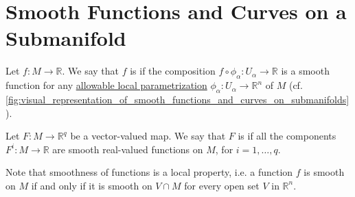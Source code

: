 \documentclass[notoc,notitlepage]{tufte-book}
\begin{document}

\section{Smooth Functions and Curves on a Submanifold}%
\label{sec:smooth_functions_and_curves_on_a_submanifold}

\begin{defn}\label{defn:smooth_functions_on_submanifolds}
  Let $f : M \to \mathbb{R}$. We say that $f$ is  if the
  composition $f \circ \phi_\alpha : U_\alpha \to \mathbb{R}$ is a smooth
  function for any \hyperref[defn:local_parametrizations]{allowable local
  parametrization} $\phi_\alpha : U_\alpha \to \mathbb{R}^n$ of $M$ (cf.
  \cref{fig:visual_representation_of_smooth_functions_and_curves_on_submanifolds}).

  Let $F : M \to \mathbb{R}^q$ be a vector-valued map. We say that $F$ is
   if all the components $F^i : M \to \mathbb{R}$ are smooth
  real-valued functions on $M$, for $i = 1, \ldots, q$.
\end{defn}

\begin{remark}\label{remark:smoothness_as_a_local_property_on_submanifolds}
  Note that smoothness of functions is a local property, i.e. a function $f$ is
  smooth on $M$ if and only if it is smooth on $V \cap M$ for every open set $V$
  in $\mathbb{R}^n$.
\end{remark}
\end{document}
